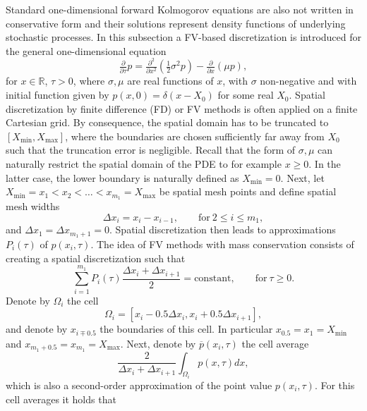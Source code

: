 \documentclass[10pt]{article}
\def\R{\mathbb{R}}
\begin{document}
Standard one-dimensional forward Kolmogorov equations are also not written in conservative form and their solutions represent density functions of underlying stochastic processes. In this subsection a FV-based discretization is introduced for the general one-dimensional equation 
\begin{equation}
\tfrac{\partial}{\partial \tau} p =  \tfrac{\partial^{2}}{\partial x^{2}} \left( \tfrac{1}{2} \sigma^{2}p \right) - \tfrac{\partial}{\partial x} \left( \mu p \right),
\label{eq:GeneralForward1D}
\end{equation} 
for $x\in \R$, $\tau >0$, where $\sigma, \mu$ are real functions of $x$, with $\sigma$ non-negative and with initial function given by $p(x,0) = \delta(x-X_{0})$ for some real $X_{0}$.
Spatial discretization by finite difference (FD) or FV methods is often applied on a finite Cartesian grid. By consequence, the spatial domain has to be truncated to $[X_{\min}, X_{\max}]$, where the boundaries are chosen sufficiently far away from $X_{0}$ such that the truncation error is negligible. 
Recall that the form of $\sigma, \mu$ can naturally restrict the spatial domain of the PDE to for example $x \ge 0$. 
In the latter case, the lower boundary is naturally defined as $X_{\min}=0$. 
Next, let $X_{\min} = x_{1} < x_{2} < \ldots < x_{m_{1}} = X_{\max}$ be spatial mesh points and define spatial mesh widths
$$ \Delta x_{i} = x_{i} - x_{i-1}, \qquad \mathrm{for} \ 2 \le i \le m_{1},$$
and $\Delta x_{1} = \Delta x_{m_{1}+1} = 0$.
Spatial discretization then leads to approximations $P_{i}(\tau)$ of $p(x_{i},\tau)$. The idea of FV methods with mass conservation consists of creating a spatial discretization such that 
\begin{equation}
\sum_{i=1}^{m_{1}} P_{i}(\tau) \frac{\Delta x_{i} + \Delta x_{i+1}}{2} = \mathrm{constant,} \qquad \mathrm{for} \ \tau \ge 0.
\label{eq:ConservationMass1D}
\end{equation}
Denote by $\Omega_{i}$ the cell
\begin{equation}
\Omega_{i} = [x_{i} - 0.5\Delta x_{i}, x_{i} + 0.5\Delta x_{i+1}],
\end{equation}
and denote by $x_{i \mp 0.5}$ the boundaries of this cell. In particular $x_{0.5}=x_{1}=X_{\min}$ and $x_{m_{1}+0.5}=x_{m_{1}}=X_{\max}$. Next, denote by $\overline{p}(x_{i},\tau)$ the cell average
$$ \frac{2}{\Delta x_{i} + \Delta x_{i+1}} \int_{\Omega_{i}} p(x,\tau) dx, $$
which is also a second-order approximation of the point value $p(x_{i},\tau)$. For this cell averages it holds that
\end{document}
